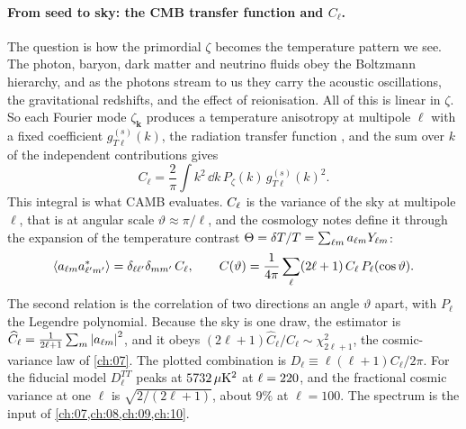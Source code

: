 \paragraph{From seed to sky: the CMB transfer function and $C_\ell$.}
The question is how the primordial $\zeta$ becomes the temperature pattern we see. The photon, baryon, dark matter and neutrino fluids obey the Boltzmann hierarchy, and as the photons stream to us they carry the acoustic oscillations, the gravitational redshifts, and the effect of reionisation. All of this is linear in $\zeta$. So each Fourier mode $\zeta_{\bm k}$ produces a temperature anisotropy at multipole $\ell$ with a fixed coefficient $g^{(s)}_{T\ell}(k)$, the radiation transfer function , and the sum over $k$ of the independent contributions gives
\begin{equation*}
C_\ell=\frac{2}{\pi}\int k^2\,\dd k\,P_\zeta(k)\,g^{(s)}_{T\ell}(k)^2 .
\end{equation*}
This integral is what CAMB evaluates. $C_\ell$ is the variance of the sky at multipole $\ell$, that is at angular scale $\vartheta\approx\pi/\ell$, and the cosmology notes define it through the expansion of the temperature contrast $\Theta=\delta T/T=\sum_{\ell m}a_{\ell m} Y_{\ell m}$:
\begin{equation*}
\langle a_{\ell m} a^*_{\ell'm'}\rangle=\delta_{\ell\ell'}\delta_{mm'}\,C_\ell,
\qquad
C(\vartheta)=\frac{1}{4\pi}\sum_\ell(2\ell+1)\,C_\ell\,P_\ell(\cos\vartheta).
\end{equation*}
The second relation is the correlation of two directions an angle $\vartheta$ apart, with $P_\ell$ the Legendre polynomial. Because the sky is one draw, the estimator is $\widehat C_\ell=\frac1{2\ell+1}\sum_m\left\lvert a_{\ell m}\right\rvert^2$, and it obeys $(2\ell+1)\widehat C_\ell/C_\ell\sim\chi^2_{2\ell+1}$, the cosmic-variance law of \cref{ch:07}. The plotted combination is $D_\ell\equiv\ell(\ell+1)C_\ell/2\pi$. For the fiducial model $D_\ell^{TT}$ peaks at $5732\,\mu\mathrm K^2$ at $\ell=220$, and the fractional cosmic variance at one $\ell$ is $\sqrt{2/(2\ell+1)}$, about $9\%$ at $\ell=100$. The spectrum is the input of \cref{ch:07,ch:08,ch:09,ch:10}.

